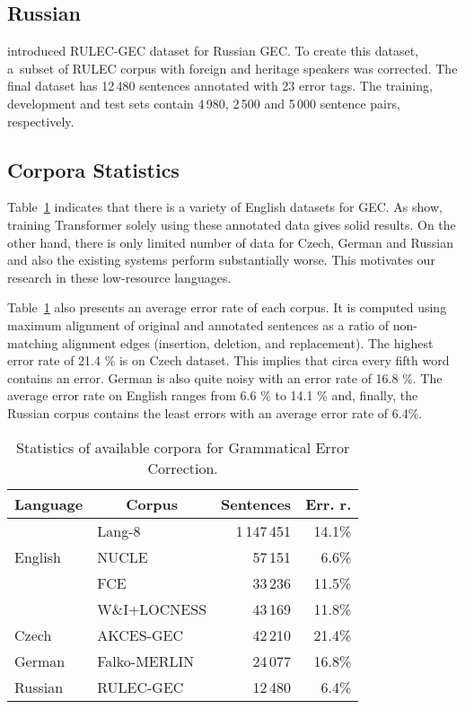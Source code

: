 \documentclass[11pt,a4paper]{article}
\begin{document}
\subsection{Russian}

 introduced RULEC-GEC dataset for Russian GEC. To create this dataset, a~subset of RULEC corpus with foreign and heritage speakers was corrected. The final dataset has 12\,480 sentences annotated with 23 error tags. The training, development and test sets contain 4\,980, 2\,500 and 5\,000 sentence pairs, respectively.

\subsection{Corpora Statistics}
 Table~\ref{tab:data_overview} indicates that there is a variety of English datasets for GEC. As  show, training Transformer solely using these annotated data gives solid results. On the other hand, there is only limited number of data for Czech, German and Russian and also the existing systems perform substantially worse. This motivates our research in these low-resource languages.
 
 Table~\ref{tab:data_overview} also presents an average error rate of each corpus. It is computed using maximum alignment of original and annotated sentences as a ratio of non-matching alignment edges (insertion, deletion, and replacement). The highest error rate of 21.4 \% is on Czech dataset. This implies that circa every fifth word contains an error. German is also quite noisy with an error rate of 16.8 \%. The average error rate on English ranges from 6.6 \% to 14.1 \% and, finally, the Russian corpus contains the least errors with an average error rate of 6.4\%.

\begin{table}[t]
    \centering
    \setlength{\tabcolsep}{3.3pt}
    \begin{tabular}{l|l|r|r}
        \multicolumn{1}{c|}{Language} & \multicolumn{1}{c|}{Corpus} & \multicolumn{1}{c|}{Sentences} & \multicolumn{1}{c}{Err. r.} \\\hline
        \multirow{3}{*}{English} & Lang-8 & 1\,147\,451 &  14.1\% \\\cline{2-4} & NUCLE & 57\,151 & 6.6\%\\\cline{2-4} & FCE & 33\,236  & 11.5\% \\\cline{2-4} & W\&I+LOCNESS & 43\,169 & 11.8\% \\\hline Czech & AKCES-GEC & 42\,210 & 21.4\% \\\hline German & Falko-MERLIN & 24\,077 & 16.8\% \\\hline Russian & RULEC-GEC & 12\,480 & 6.4\% \\
    \end{tabular}
    \caption{Statistics of available corpora for Grammatical Error Correction.}
    \label{tab:data_overview}
\end{table}
\end{document}
